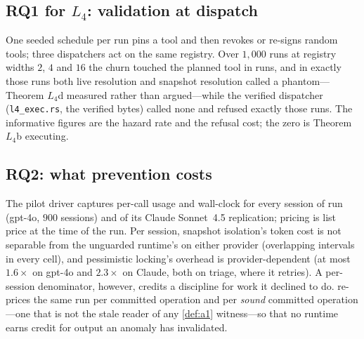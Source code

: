 \subsection{RQ1 for $L_4$: validation at dispatch}
\label{sec:l4-eval}
One seeded schedule per run pins a tool and then revokes or re-signs random
tools; three dispatchers act on the same registry. Over $1{,}000$ runs at
registry widths $2$, $4$ and $16$ the churn touched the planned tool in
\LfourPhantom{} runs, and in exactly those runs both live resolution and
snapshot resolution called a phantom---Theorem $L_4$d measured rather than
argued---while the verified dispatcher (\texttt{l4\_exec.rs}, the verified
bytes) called none and refused exactly those runs. The informative figures
are the hazard rate and the refusal cost; the zero is Theorem $L_4$b
executing.

\subsection{RQ2: what prevention costs}
\label{sec:cost}
The pilot driver captures per-call usage and wall-clock for every session of
run \texttt{\CostRun} (gpt-4o, $900$ sessions) and of its Claude Sonnet~4.5
replication; pricing is list price at the time of the run. Per session,
snapshot isolation's token cost is not separable from the unguarded
runtime's on either provider (overlapping intervals in every cell), and
pessimistic locking's overhead is provider-dependent (at most $1.6\times$
on gpt-4o and $2.3\times$ on Claude, both on triage, where it retries). A
per-session denominator, however, credits a discipline for work it declined
to do.  re-prices the same run per committed
operation and per \emph{sound} committed operation---one that is not the
stale reader of any \cref{def:a1} witness---so that no runtime earns credit
for output an anomaly has invalidated.

